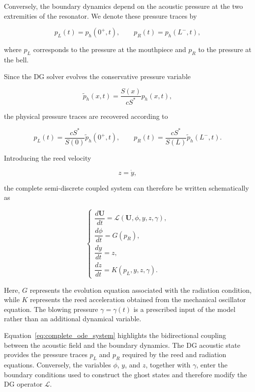 \documentclass[11pt,a4paper]{report}
\theoremstyle{plain}
\theoremstyle{definition}
\begin{document}
Conversely, the boundary dynamics depend on the acoustic pressure at the two
extremities of the resonator. We denote these pressure traces by

\begin{equation}
p_L(t)=p_h(0^+,t),
\qquad
p_R(t)=p_h(L^-,t),
\label{eq:pressure_traces}
\end{equation}

where \(p_L\) corresponds to the pressure at the mouthpiece and \(p_R\) to the
pressure at the bell.

Since the DG solver evolves the conservative pressure variable

\begin{equation}
\tilde p_h(x,t)
=
\frac{S(x)}{cS^\ast}p_h(x,t),
\end{equation}

the physical pressure traces are recovered according to

\begin{equation}
\boxed{
p_L(t)
=
\frac{cS^\ast}{S(0)}
\tilde p_h(0^+,t),
\qquad
p_R(t)
=
\frac{cS^\ast}{S(L)}
\tilde p_h(L^-,t).
}
\label{eq:physical_pressure_traces}
\end{equation}

Introducing the reed velocity

\begin{equation}
z=\dot y,
\end{equation}

the complete semi-discrete coupled system can therefore be written
schematically as

\begin{equation}
\boxed{
\begin{cases}
\dfrac{d\mathbf U}{dt}
=
\mathcal L
\left(
\mathbf U,\phi,y,z,\gamma
\right),
\\[0.7em]
\dfrac{d\phi}{dt}
=
G(p_R),
\\[0.7em]
\dfrac{dy}{dt}
=
z,
\\[0.7em]
\dfrac{dz}{dt}
=
K(p_L,y,z,\gamma).
\end{cases}
}
\label{eq:complete_ode_system}
\end{equation}

Here, \(G\) represents the evolution equation associated with the radiation
condition, while \(K\) represents the reed acceleration obtained from the
mechanical oscillator equation. The blowing pressure \(\gamma=\gamma(t)\) is
a prescribed input of the model rather than an additional dynamical variable.

Equation~\eqref{eq:complete_ode_system} highlights the bidirectional coupling
between the acoustic field and the boundary dynamics. The DG acoustic state
provides the pressure traces \(p_L\) and \(p_R\) required by the reed and
radiation equations. Conversely, the variables \(\phi\), \(y\), and \(z\),
together with \(\gamma\), enter the boundary conditions used to construct the
ghost states and therefore modify the DG operator \(\mathcal L\).
\end{document}
